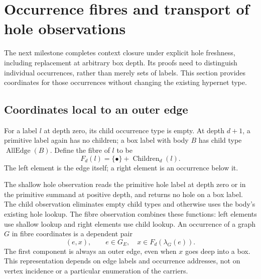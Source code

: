 \section{Occurrence fibres and transport of hole observations}
The next milestone completes context closure under explicit hole freshness,
including replacement at arbitrary box depth. Its proofs need to distinguish
individual occurrences, rather than merely sets of labels. This section provides
coordinates for those occurrences without changing the existing hypernet type.

\subsection{Coordinates local to an outer edge}
\begin{definition}\label{term:fibre}
For a label $l$ at depth zero, its child occurrence type is empty. At depth $d+1$,
a primitive label again has no children; a box label with body $B$ has child type
$\operatorname{AllEdge}(B)$. Define the fibre of $l$ to be
\[
 F_d(l)=\{\bullet\}+\operatorname{Children}_d(l).
\]
The left element is the edge itself; a right element is an occurrence below it.
\end{definition}
The shallow hole observation reads the primitive hole label at depth zero or in
the primitive summand at positive depth, and returns no hole on a box label.
The child observation eliminates empty child types and otherwise uses the
body's existing hole lookup. The fibre observation combines these functions:
left elements use shallow lookup and right elements use child lookup.
An occurrence of a graph $G$ in fibre coordinates is a dependent pair
\[
 (e,x),\qquad e\in G_E,\quad x\in F_d(\lambda_G(e)).
\]
The first component is always an outer edge, even when $x$ goes deep into a box.
This representation depends on edge labels and occurrence addresses, not on
vertex incidence or a particular enumeration of the carriers.

